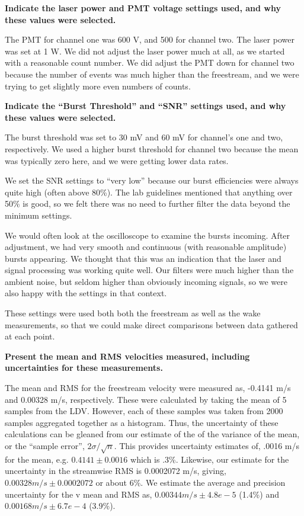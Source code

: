 \documentclass{article}
\begin{document}
\textbf{Indicate the laser power and PMT voltage settings used, and why
these values were selected.} 

The PMT for channel one was 600 V, and 500 for channel two. The laser
power was set at 1 W. We did not adjust the laser power much at all, as
we started with a reasonable count number. We did adjust the PMT down
for channel two because the number of events was much higher than the
freestream, and we were trying to get slightly more even numbers of
counts. 

\textbf{Indicate the ``Burst Threshold'' and ``SNR'' settings used, and why
these values were selected.} 


The burst threshold was set to 30 mV and 60 mV for channel's one and
two, respectively. We used a higher burst threshold for channel two
because the mean was typically zero here, and we were getting lower data
rates. 

We set the SNR settings to ``very low'' because our burst efficiencies
were always quite high (often above 80\%). The lab guidelines mentioned
that anything over 50\% is good, so we felt there was no need to further
filter the data beyond the minimum settings. 

We would often look at the oscilloscope to examine the bursts incoming. 
After adjustment, we had very smooth and continuous (with reasonable
amplitude) bursts appearing. We thought that this was an indication that
the laser and signal processing was working quite well. Our filters were
much higher than the ambient noise, but seldom higher than obviously
incoming signals, so we were also happy with the settings in that
context. 

These settings were used both both the freestream as well as the wake
measurements, so that we could make direct comparisons between data
gathered at each point. 

%
%
%

\textbf{Present the mean and RMS velocities measured, including
uncertainties for these measurements.} 

The mean and RMS for the freestream velocity were measured as, 
-0.4141 m/s and 0.00328 m/s, respectively. These were calculated by
taking the mean of 5 samples from the LDV. However, each of these
samples was taken from 2000 samples aggregated together as a
histogram. Thus, the uncertainty of these calculations
can be gleaned from our estimate of the of the variance of the mean, or
the ``sample error'', $2\sigma/\sqrt{n}$. This provides uncertainty
estimates of, .0016 m/s for the mean, e.g. $0.4141 \pm
0.0016$ which is .3\%. Likewise, our estimate for the uncertainty in the
streamwise RMS is 0.0002072 m/s, giving, $0.00328 m/s \pm 0.0002072$ or
about 6\%. We estimate the average and precision uncertainty for the v
mean and RMS as, $0.00344 m/s \pm 4.8e-5$ (1.4\%) and $0.00168 m/s \pm
6.7e-4$ (3.9\%). 
\end{document}
